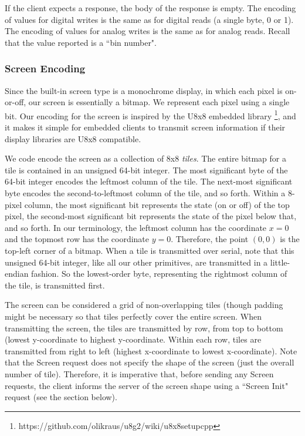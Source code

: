 \documentclass[12pt]{article}
\begin{document}
If the client expects a response, the body of the response is empty.  The encoding of values for digital writes is the same as for digital reads (a single byte, 0 or 1).  The encoding of values for analog writes is the same as for analog reads.  Recall that the value reported is a ``bin number".

\subsubsection{Screen Encoding}
Since the built-in screen type is a monochrome display, in which each pixel is on-or-off, our screen is essentially a bitmap.  We represent each pixel using a single bit.  Our encoding for the screen is inspired by the U8x8 embedded library \footnote{https://github.com/olikraus/u8g2/wiki/u8x8setupcpp}, and it makes it simple for embedded clients to transmit screen information if their display libraries are U8x8 compatible.

We code encode the screen as a collection of 8x8 \textit{tiles}.  The entire bitmap for a tile is contained in an unsigned 64-bit integer.  The most significant byte of the 64-bit integer encodes the leftmost column of the tile.  The next-most significant byte encodes the second-to-leftmost column of the tile, and so forth.  Within a 8-pixel column, the most significant bit represents the state (on or off) of the top pixel, the second-most significant bit represents the state of the pixel below that, and so forth.  In our terminology, the leftmost column has the coordinate $x=0$ and the topmost row has the coordinate $y=0$.  Therefore, the point $(0, 0)$ is the top-left corner of a bitmap.  When a tile is transmitted over serial, note that this unsigned 64-bit integer, like all our other primitives, are transmitted in a little-endian fashion.  So the lowest-order byte, representing the rightmost column of the tile, is transmitted first.

The screen can be considered a grid of non-overlapping tiles (though padding might be necessary so that tiles perfectly cover the entire screen.  When transmitting the screen, the tiles are transmitted by row, from top to bottom (lowest y-coordinate to highest y-coordinate.  Within each row, tiles are transmitted from right to left (highest x-coordinate to lowest x-coordinate).  Note that the Screen request does not specify the shape of the screen (just the overall number of tile).  Therefore, it is imperative that, before sending any Screen requests, the client informs the server of the screen shape using a ``Screen Init" request (see the section below).
\end{document}
